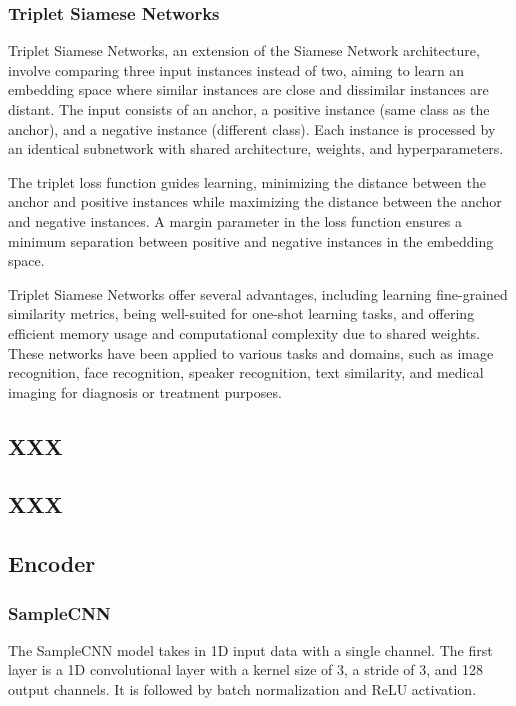 \subsubsection{Triplet Siamese Networks}

Triplet Siamese Networks, an extension of the Siamese Network architecture, involve comparing three input instances instead of two, aiming to learn an embedding space where similar instances are close and dissimilar instances are distant. The input consists of an anchor, a positive instance (same class as the anchor), and a negative instance (different class). Each instance is processed by an identical subnetwork with shared architecture, weights, and hyperparameters.

The triplet loss function guides learning, minimizing the distance between the anchor and positive instances while maximizing the distance between the anchor and negative instances. A margin parameter in the loss function ensures a minimum separation between positive and negative instances in the embedding space.

Triplet Siamese Networks offer several advantages, including learning fine-grained similarity metrics, being well-suited for one-shot learning tasks, and offering efficient memory usage and computational complexity due to shared weights. These networks have been applied to various tasks and domains, such as image recognition, face recognition, speaker recognition, text similarity, and medical imaging for diagnosis or treatment purposes.

\subsection{XXX}
\subsection{XXX}

\subsection{Encoder}
\subsubsection{SampleCNN}

The SampleCNN model \cite{Lee2018SampleCNN:Classification} takes in 1D input data with a single channel. The first layer is a 1D convolutional layer with a kernel size of 3, a stride of 3, and 128 output channels. It is followed by batch normalization and ReLU activation.

